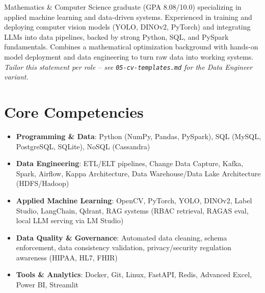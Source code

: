 \documentclass[11pt,a4paper,sans]{moderncv}
\begin{document}
\makecvtitle


\vspace{6pt}
\small{Mathematics \& Computer Science graduate (GPA 8.08/10.0) specializing in applied machine learning and data-driven systems. Experienced in training and deploying computer vision models (YOLO, DINOv2, PyTorch) and integrating LLMs into data pipelines, backed by strong Python, SQL, and PySpark fundamentals. Combines a mathematical optimization background with hands-on model deployment and data engineering to turn raw data into working systems. \textit{Tailor this statement per role -- see \texttt{05-cv-templates.md} for the Data Engineer variant.}}


\section{Core Competencies}
\vspace{1pt}
\begin{itemize}

\item \textbf{Programming \& Data}: Python (NumPy, Pandas, PySpark), SQL (MySQL, PostgreSQL, SQLite), NoSQL (Cassandra)

\item \textbf{Data Engineering}: ETL/ELT pipelines, Change Data Capture, Kafka, Spark, Airflow, Kappa Architecture, Data Warehouse/Data Lake Architecture (HDFS/Hadoop)

\item \textbf{Applied Machine Learning}: OpenCV, PyTorch, YOLO, DINOv2, Label Studio, LangChain, Qdrant, RAG systems (RBAC retrieval, RAGAS eval, local LLM serving via LM Studio)

\item \textbf{Data Quality \& Governance}: Automated data cleaning, schema enforcement, data consistency validation, privacy/security regulation awareness (HIPAA, HL7, FHIR)

\item \textbf{Tools \& Analytics}: Docker, Git, Linux, FastAPI, Redis, Advanced Excel, Power BI, Streamlit

\end{itemize}
\end{document}
